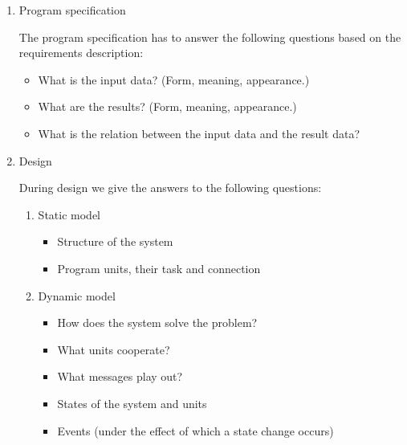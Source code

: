 \documentclass[margin=0px]{article}
\begin{document}
\begin{enumerate}
\begin{itemize}
              \item Feasibility examination

                    (Is a solution conforming to the requirements feasible?)

              \item Testability examination

                    (Are the requirements formulated so that they are testable?)

              \item Examination of the criteria of openness.

                    (Do the requirements not contradict the requirement of modifiability, further developability?)
          \end{itemize}

          One tool of analyzing the requirements is prototype-making.
          The prototype is a solution of the problem created in a high-level programming environment,
          correct from the point of view of external behavior.
    \item Program specification

          The program specification has to answer the following questions based on the
          requirements description:

          \begin{itemize}
              \item What is the input data? (Form, meaning, appearance.)
              \item What are the results? (Form, meaning, appearance.)
              \item What is the relation between the input data and the result data?
          \end{itemize}
    \item Design

          During design we give the answers to the following questions:
          \begin{enumerate}
              \item Static model
                    \begin{itemize}
                        \item Structure of the system
                        \item Program units, their task and connection
                    \end{itemize}
              \item Dynamic model
                    \begin{itemize}
                        \item How does the system solve the problem?
                        \item What units cooperate?
                        \item What messages play out?
                        \item States of the system and units
                        \item Events (under the effect of which a state change occurs)
                    \end{itemize}


\end{enumerate}
\end{enumerate}
\end{document}
